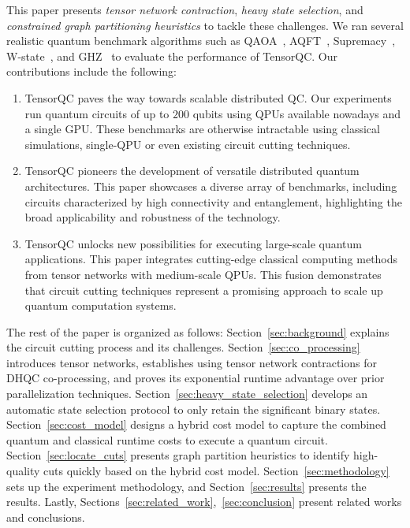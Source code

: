 This paper presents \emph{tensor network contraction},
\emph{heavy state selection},
and \emph{constrained graph partitioning heuristics}
to tackle these challenges.
We ran several realistic quantum benchmark algorithms such as QAOA~\cite{saleem2020approaches},
AQFT~\cite{barenco1996approximate},
Supremacy~\cite{arute2019quantum}, W-state~\cite{dur2000three, diker2016deterministic}, and GHZ~\cite{greenberger1989going} to evaluate the performance of TensorQC.
Our contributions include the following:
\begin{enumerate}
   \item TensorQC paves the way towards scalable distributed QC.
   Our experiments run quantum circuits of up to $200$ qubits using QPUs available nowadays and a single GPU.
   These benchmarks are otherwise intractable using classical simulations, single-QPU or even existing circuit cutting techniques.
   \item TensorQC pioneers the development of versatile distributed quantum architectures.
   This paper showcases a diverse array of benchmarks,
   including circuits characterized by high connectivity and entanglement,
   highlighting the broad applicability and robustness of the technology.
   \item TensorQC unlocks new possibilities for executing large-scale quantum applications.
   This paper integrates cutting-edge classical computing methods from tensor networks with medium-scale QPUs.
   This fusion demonstrates that circuit cutting techniques represent a promising approach to scale up quantum computation systems.
\end{enumerate}

The rest of the paper is organized as follows:
Section~\ref{sec:background} explains the circuit cutting process and its challenges.
Section~\ref{sec:co_processing} introduces tensor networks,
establishes using tensor network contractions for DHQC co-processing,
and proves its exponential runtime advantage over prior parallelization techniques.
Section~\ref{sec:heavy_state_selection} develops an automatic state selection protocol to only retain the significant binary states.
Section~\ref{sec:cost_model} designs a hybrid cost model to capture the combined quantum and classical runtime costs to execute a quantum circuit.
Section~\ref{sec:locate_cuts} presents graph partition heuristics to identify high-quality cuts quickly based on the hybrid cost model.
Section~\ref{sec:methodology} sets up the experiment methodology, and Section~\ref{sec:results} presents the results.
Lastly, Sections~\ref{sec:related_work},~\ref{sec:conclusion} present related works and conclusions.